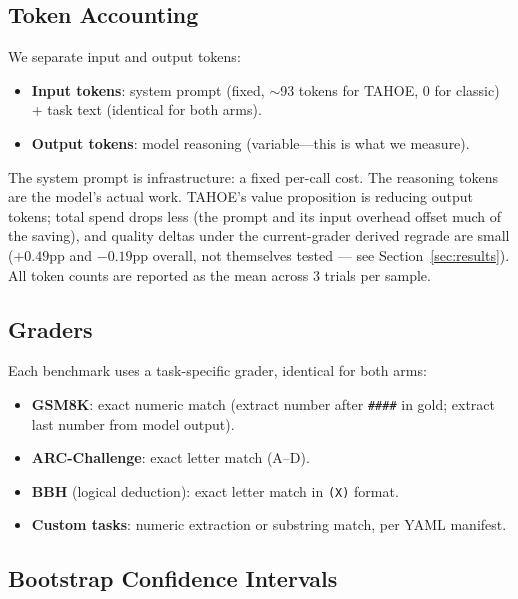 \documentclass[11pt,a4paper]{article}
\begin{document}
\subsection{Token Accounting}
\label{subsec:token-accounting}

We separate input and output tokens:

\begin{itemize}[nosep,leftmargin=*]
    \item \textbf{Input tokens}: system prompt (fixed, $\sim$93 tokens for TAHOE, 0 for classic) + task text (identical for both arms).
    \item \textbf{Output tokens}: model reasoning (variable---this is what we measure).
\end{itemize}

The system prompt is infrastructure: a fixed per-call cost.
The reasoning tokens are the model's actual work.
TAHOE's value proposition is reducing output tokens; total spend drops less
(the prompt and its input overhead offset much of the saving), and quality
deltas under the current-grader derived regrade are small ($+0.49$pp and
$-0.19$pp overall, not themselves tested --- see Section~\ref{sec:results}).
All token counts are reported as the mean across 3 trials per sample.

\subsection{Graders}
\label{subsec:graders}

Each benchmark uses a task-specific grader, identical for both arms:

\begin{itemize}[nosep,leftmargin=*]
    \item \textbf{GSM8K}: exact numeric match (extract number after \texttt{\#\#\#\#} in gold; extract last number from model output).
    \item \textbf{ARC-Challenge}: exact letter match (A--D).
    \item \textbf{BBH} (logical deduction): exact letter match in \texttt{(X)} format.
    \item \textbf{Custom tasks}: numeric extraction or substring match, per YAML manifest.
\end{itemize}

\subsection{Bootstrap Confidence Intervals}
\label{subsec:bootstrap}
\end{document}
